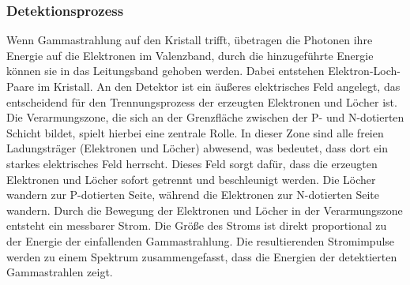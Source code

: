 \subsubsection{Detektionsprozess}
Wenn Gammastrahlung auf den Kristall trifft, übetragen die Photonen ihre Energie auf die Elektronen im Valenzband, durch die hinzugeführte Energie 
können sie in das Leitungsband gehoben werden. Dabei entstehen Elektron-Loch-Paare im Kristall. An den Detektor ist ein äußeres
elektrisches Feld angelegt, das entscheidend für den Trennungsprozess der erzeugten Elektronen und Löcher ist.
Die Verarmungszone, die sich an der Grenzfläche zwischen der P- und N-dotierten Schicht bildet, spielt hierbei eine zentrale Rolle. In dieser Zone sind alle freien
Ladungsträger (Elektronen und Löcher) abwesend, was bedeutet, dass dort ein starkes elektrisches Feld herrscht. Dieses Feld sorgt dafür, dass die erzeugten Elektronen
und Löcher sofort getrennt und beschleunigt werden. Die Löcher wandern zur P-dotierten Seite, während die Elektronen zur N-dotierten Seite wandern.
Durch die Bewegung der Elektronen und Löcher in der Verarmungszone entsteht ein messbarer Strom. Die Größe des Stroms ist direkt proportional
zu der Energie der einfallenden Gammastrahlung. Die resultierenden Stromimpulse werden zu einem Spektrum zusammengefasst, dass die Energien der detektierten 
Gammastrahlen zeigt. 
\cite{germaniumdetektor}






 